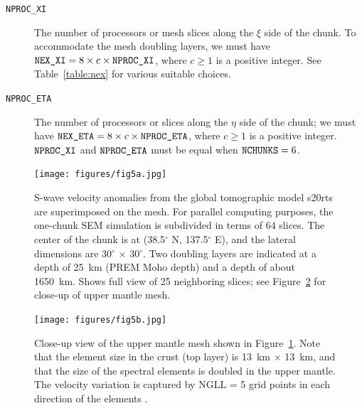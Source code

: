 \begin{description}
\item [{\texttt{NPROC\_XI}}] The number of processors or mesh slices along the
$\xi$ side of the chunk. To accommodate the mesh doubling layers,
we must have $\mbox{\texttt{NEX\_XI}}=8\times c\times\mbox{\texttt{NPROC\_XI}}$, where $c\ge1$ is
a positive integer. See Table~\ref{table:nex} for various suitable
choices.
\item [{\texttt{NPROC\_ETA}}] The number of processors or slices along the $\eta$
side of the chunk; we must have $\mbox{\texttt{NEX\_ETA}}=8\times c\times\mbox{\texttt{NPROC\_ETA}}$,
where $c\ge1$ is a positive integer. $\mbox{\texttt{NPROC\_XI}}$ and $\mbox{\texttt{NPROC\_ETA}}$
must be equal when $\mbox{\texttt{NCHUNKS}}=6$.
\end{description}
%
\begin{figure}[H]
\begin{centering}
\texttt{[image: figures/fig5a.jpg]}
\par\end{centering}

\caption{S-wave velocity anomalies
from the global tomographic model s20rts \citep{RiVa00} are superimposed
on the mesh. For parallel computing purposes, the one-chunk SEM simulation
is subdivided in terms of 64 slices. The center of the chunk is at
(38.5$^{\circ}$ N, 137.5$^{\circ}$ E), and the lateral dimensions
are 30$^{\circ}$ $\times$ 30$^{\circ}$. Two doubling layers are
indicated at a depth of 25~km (PREM Moho depth) and a depth of about
1650~km. Shows full view of 25 neighboring slices; see Figure~\ref{fig:Close-up-view-of}
for close-up of upper mantle mesh.}
\label{fig:3D-spectral-element-mesh}
\end{figure}
%
\begin{figure}[H]
\begin{centering}
\texttt{[image: figures/fig5b.jpg]}
\par\end{centering}

\caption{Close-up view of the upper mantle
mesh shown in Figure~\ref{fig:3D-spectral-element-mesh}. Note that
the element size in the crust (top layer) is 13~km $\times$ 13~km,
and that the size of the spectral elements is doubled in the upper
mantle. The velocity variation is captured by NGLL = 5 grid points
in each direction of the elements \citep{KoTr02a,KoTr02b}.}
\label{fig:Close-up-view-of}
\end{figure}


